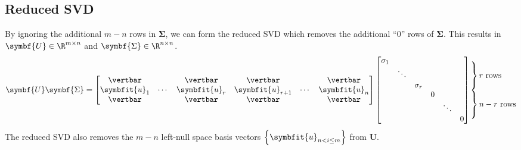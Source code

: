 \documentclass{article}
\begin{document}
\begin{multicols*}{3}
    \subsection{Reduced SVD}
    By ignoring the additional \(m - n\) rows in \(\symbf{\Sigma}\), we can form the reduced SVD which removes the
    additional ``0'' rows of \(\symbf{\Sigma}\). This results in \(\symbf{U} \in \R^{m \times n}\) and
    \(\symbf{\Sigma} \in \R^{n \times n}\).
    \begin{equation*}
        \symbf{U} \symbf{\Sigma} = \begin{bmatrix}
            \vertbar      &        & \vertbar      & \vertbar          &        & \vertbar      \\
            \symbfit{u}_1 & \cdots & \symbfit{u}_r & \symbfit{u}_{r+1} & \cdots & \symbfit{u}_n \\
            \vertbar      &        & \vertbar      & \vertbar          &        & \vertbar
        \end{bmatrix} \begin{bmatrix}
            \sigma_1 &        &          &   &        &   \\
                     & \ddots &          &   &        &   \\
                     &        & \sigma_r &   &        &   \\
                     &        &          & 0 &        &   \\
                     &        &          &   & \ddots &   \\
                     &        &          &   &        & 0
        \end{bmatrix}
        \setlength{\arraycolsep}{0pt}
        \begin{array}{ l }
            \left.\kern-\nulldelimiterspace
            \vphantom{\begin{array}{ c }
                              0 \\
                              0 \\
                              0
                          \end{array}}
            \right\}\text{\(r\) rows} \\
            \left.\kern-\nulldelimiterspace
            \vphantom{\begin{array}{ c }
                              0 \\
                              0 \\
                              0
                          \end{array}}
            \right\}\text{\(n - r\) rows}
        \end{array}
    \end{equation*}
    The reduced SVD also removes the \(m - n\) left-null space basis vectors \(\left\{ \symbfit{u}_{n < i \leq m} \right\}\) from \(\symbf{U}\).

\end{multicols*}
\end{document}
